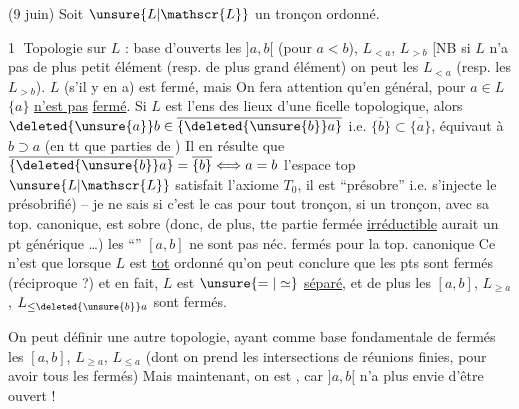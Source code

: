 (9 juin) Soit $\unsure{L|\mathscr{L}}$ un tronçon ordonné.

\deleted{Un sous-segment \unsure{d'un|dans} \uline{sous-tronçon} \uline{fermé} de $L$ est un sous ens de la forme $[a,$}

\textcircled{1} Topologie sur $L$ : base d'ouverts les $]a,b[$ (pour $a<b$), $L_{<a}$\deleted{\unsure{,}}, $L_{>b}$
[NB si $L$ n'a pas de plus petit élément (resp. de plus grand élément) on peut  les $L_{<a}$ (resp. les $L_{>b}$).   $L$  (s'il y en a) est fermé, mais 
On fera attention qu'en général,   pour $a\in L$ $\{a\}$ \uline{n'est pas}  \uline{fermé}. Si $L$ est l'ens des lieux d'une  ficelle topologique,  alors $\deleted{\unsure{a}}b\in\overline{\{\deleted{\unsure{b}}a\}}$ i.e. $\overline{\{b\}}\subset\overline{\{a\}}$, équivaut à $b\supset a$ (en tt que parties de )
Il en résulte que $\overline{\{\deleted{\unsure{b}}a\}}=\overline{\{b\}}\Longleftrightarrow a=b$  l'espace top $\unsure{L|\mathscr{L}}$ satisfait l'axiome $T_0$, il est ``présobre'' i.e. s'injecte  le présobrifié) -- je ne sais si c'est
le cas pour tout tronçon,  si un tronçon, avec sa top. canonique, est sobre (donc, de plus, tte partie fermée \uline{irréductible} aurait un pt générique \dots)
les ``'' $[a,b]$ ne sont pas néc. fermés pour la top. canonique\unsure{$^{\dagger}$|$^{+}$|!}
Ce n'est que lorsque $L$ est \uline{tot} ordonné qu'on peut conclure que les pts sont fermés (réciproque ?) et en fait, $L$ est $\unsure{=|\simeq}$ \uline{séparé}, et de plus les $[a,b]$, $L_{\geq a}$, $L_{\leq\deleted{\unsure{b}}a}$ sont fermés.

On peut définir une autre topologie, ayant comme base fondamentale de fermés les $[a,b]$, $L_{\geq a}$, $L_{\leq a}$ (dont on prend les intersections  de réunions finies, pour avoir tous les fermés)
Mais maintenant, on est , car $]a,b[$ n'a plus envie d'être ouvert !

